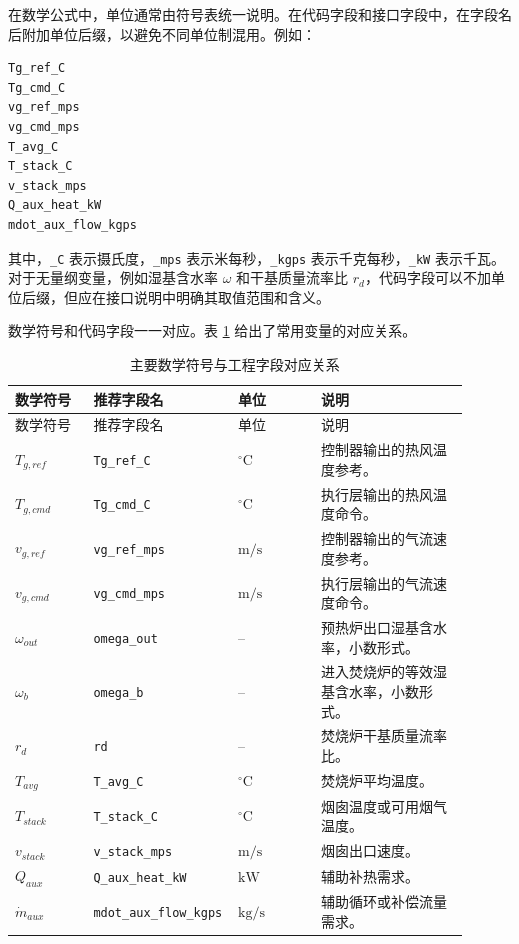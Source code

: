 \documentclass[UTF8,openany,zihao=-4,oneside]{ctexbook}
\begin{document}
在数学公式中，单位通常由符号表统一说明。在代码字段和接口字段中，在字段名后附加单位后缀，以避免不同单位制混用。例如：

\begin{lstlisting}
Tg_ref_C
Tg_cmd_C
vg_ref_mps
vg_cmd_mps
T_avg_C
T_stack_C
v_stack_mps
Q_aux_heat_kW
mdot_aux_flow_kgps
\end{lstlisting}

其中，\texttt{\_C} 表示摄氏度，\texttt{\_mps} 表示米每秒，\texttt{\_kgps} 表示千克每秒，\texttt{\_kW} 表示千瓦。对于无量纲变量，例如湿基含水率 \(\omega\) 和干基质量流率比 \(r_d\)，代码字段可以不加单位后缀，但应在接口说明中明确其取值范围和含义。

数学符号和代码字段一一对应。表 \ref{tab:math-code-map} 给出了常用变量的对应关系。

\begin{longtable}{@{}p{0.17\linewidth}p{0.23\linewidth}p{0.18\linewidth}p{0.32\linewidth}@{}}
\caption{主要数学符号与工程字段对应关系}\label{tab:math-code-map}\\
\toprule
数学符号 & 推荐字段名 & 单位 & 说明 \\
\midrule
\endfirsthead
\toprule
数学符号 & 推荐字段名 & 单位 & 说明 \\
\midrule
\endhead
\(T_{g,ref}\) & \texttt{Tg\_ref\_C} & \(^\circ\mathrm{C}\) & 控制器输出的热风温度参考。 \\
\(T_{g,cmd}\) & \texttt{Tg\_cmd\_C} & \(^\circ\mathrm{C}\) & 执行层输出的热风温度命令。 \\
\(v_{g,ref}\) & \texttt{vg\_ref\_mps} & \(\mathrm{m/s}\) & 控制器输出的气流速度参考。 \\
\(v_{g,cmd}\) & \texttt{vg\_cmd\_mps} & \(\mathrm{m/s}\) & 执行层输出的气流速度命令。 \\
\(\omega_{out}\) & \texttt{omega\_out} & -- & 预热炉出口湿基含水率，小数形式。 \\
\(\omega_b\) & \texttt{omega\_b} & -- & 进入焚烧炉的等效湿基含水率，小数形式。 \\
\(r_d\) & \texttt{rd} & -- & 焚烧炉干基质量流率比。 \\
\(T_{avg}\) & \texttt{T\_avg\_C} & \(^\circ\mathrm{C}\) & 焚烧炉平均温度。 \\
\(T_{stack}\) & \texttt{T\_stack\_C} & \(^\circ\mathrm{C}\) & 烟囱温度或可用烟气温度。 \\
\(v_{stack}\) & \texttt{v\_stack\_mps} & \(\mathrm{m/s}\) & 烟囱出口速度。 \\
\(Q_{aux}\) & \texttt{Q\_aux\_heat\_kW} & \(\mathrm{kW}\) & 辅助补热需求。 \\
\(\dot m_{aux}\) & \texttt{mdot\_aux\_flow\_kgps} & \(\mathrm{kg/s}\) & 辅助循环或补偿流量需求。 \\
\bottomrule
\end{longtable}
\end{document}
